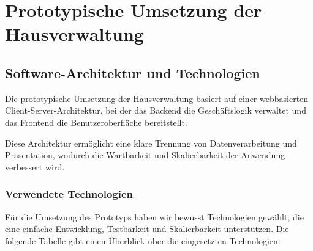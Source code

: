 \section{Prototypische Umsetzung der Hausverwaltung}\label{Prototypische Umsetzung der Hausverwaltung}


\subsection{Software-Architektur und Technologien}



Die prototypische Umsetzung der Hausverwaltung basiert auf einer webbasierten Client-Server-Architektur, bei der das Backend die Geschäftslogik verwaltet und das Frontend die Benutzeroberfläche bereitstellt.\par
Diese Architektur ermöglicht eine klare Trennung von Datenverarbeitung und Präsentation, wodurch die Wartbarkeit und Skalierbarkeit der Anwendung verbessert wird.

\subsubsection{Verwendete Technologien}

Für die Umsetzung des Prototyps haben wir bewusst Technologien gewählt, die eine einfache Entwicklung, Testbarkeit und Skalierbarkeit unterstützen.
Die folgende Tabelle gibt einen Überblick über die eingesetzten Technologien:

